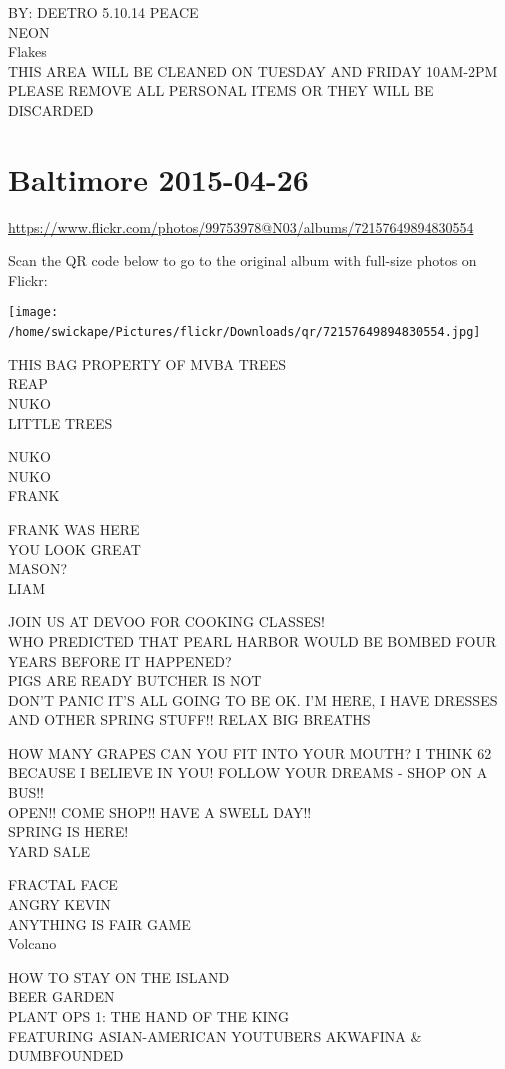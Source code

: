 \documentclass[10pt,letterpaper]{article}
\begin{document}
BY: DEETRO 5.10.14 PEACE\\
NEON\\
Flakes\\
THIS AREA WILL BE CLEANED ON TUESDAY AND FRIDAY 10AM{-}2PM PLEASE REMOVE ALL PERSONAL ITEMS OR THEY WILL BE DISCARDED
\

\section*{Baltimore 2015-04-26}

\url{https://www.flickr.com/photos/99753978@N03/albums/72157649894830554}

Scan the QR code below to go to the original album with full-size photos on Flickr:

\texttt{[image: /home/swickape/Pictures/flickr/Downloads/qr/72157649894830554.jpg]}
\

THIS BAG PROPERTY OF MVBA TREES\\
REAP\\
NUKO\\
LITTLE TREES

NUKO\\
NUKO\\
FRANK

FRANK WAS HERE\\
YOU LOOK GREAT\\
MASON?\\
LIAM

JOIN US AT DEVOO FOR COOKING CLASSES!\\
WHO PREDICTED THAT PEARL HARBOR WOULD BE BOMBED FOUR YEARS BEFORE IT HAPPENED?\\
PIGS ARE READY BUTCHER IS NOT\\
DON'T PANIC IT'S ALL GOING TO BE OK.  I'M HERE, I HAVE DRESSES AND OTHER SPRING STUFF!!  RELAX BIG BREATHS

HOW MANY GRAPES CAN YOU FIT INTO YOUR MOUTH?  I THINK 62 BECAUSE I BELIEVE IN YOU!  FOLLOW YOUR DREAMS {-} SHOP ON A BUS!!\\
OPEN!! COME SHOP!! HAVE A SWELL DAY!!\\
SPRING IS HERE!\\
YARD SALE

FRACTAL FACE\\
ANGRY KEVIN\\
ANYTHING IS FAIR GAME\\
Volcano

HOW TO STAY ON THE ISLAND\\
BEER GARDEN\\
PLANT OPS 1: THE HAND OF THE KING\\
FEATURING ASIAN{-}AMERICAN YOUTUBERS AKWAFINA \& DUMBFOUNDED
\end{document}
